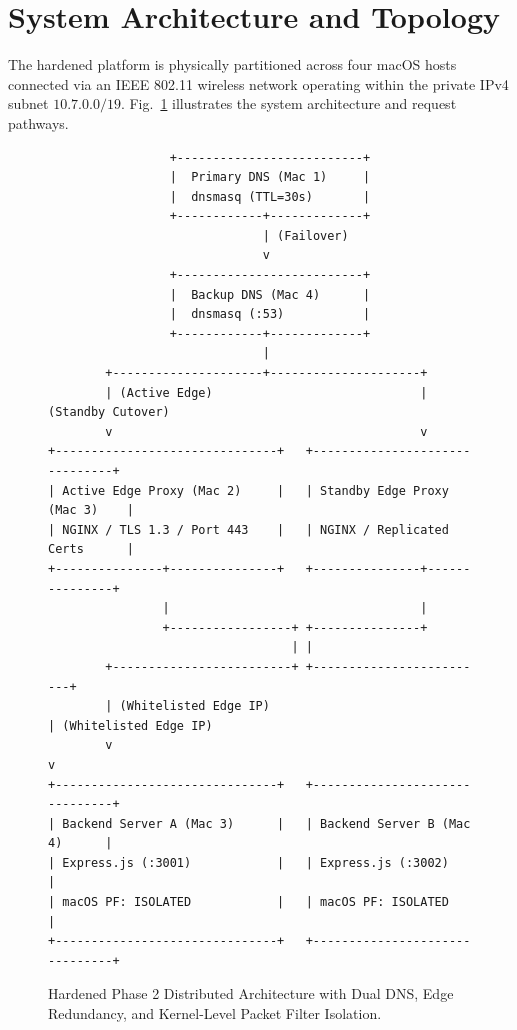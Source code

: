 \documentclass[conference]{IEEEtran}
\begin{document}
\section{System Architecture and Topology}
The hardened platform is physically partitioned across four macOS hosts connected via an IEEE 802.11 wireless network operating within the private IPv4 subnet $10.7.0.0/19$. Fig.~\ref{fig:arch} illustrates the system architecture and request pathways.

\begin{figure}[htbp]
\centering
\begin{lstlisting}
                 +--------------------------+
                 |  Primary DNS (Mac 1)     |
                 |  dnsmasq (TTL=30s)       |
                 +------------+-------------+
                              | (Failover)
                              v
                 +--------------------------+
                 |  Backup DNS (Mac 4)      |
                 |  dnsmasq (:53)           |
                 +------------+-------------+
                              |
        +---------------------+---------------------+
        | (Active Edge)                             | (Standby Cutover)
        v                                           v
+-------------------------------+   +-------------------------------+
| Active Edge Proxy (Mac 2)     |   | Standby Edge Proxy (Mac 3)    |
| NGINX / TLS 1.3 / Port 443    |   | NGINX / Replicated Certs      |
+---------------+---------------+   +---------------+---------------+
                |                                   |
                +-----------------+ +---------------+
                                  | |
        +-------------------------+ +-------------------------+
        | (Whitelisted Edge IP)                               | (Whitelisted Edge IP)
        v                                                     v
+-------------------------------+   +-------------------------------+
| Backend Server A (Mac 3)      |   | Backend Server B (Mac 4)      |
| Express.js (:3001)            |   | Express.js (:3002)            |
| macOS PF: ISOLATED            |   | macOS PF: ISOLATED            |
+-------------------------------+   +-------------------------------+
\end{lstlisting}
\caption{Hardened Phase 2 Distributed Architecture with Dual DNS, Edge Redundancy, and Kernel-Level Packet Filter Isolation.}
\label{fig:arch}
\end{figure}
\end{document}
